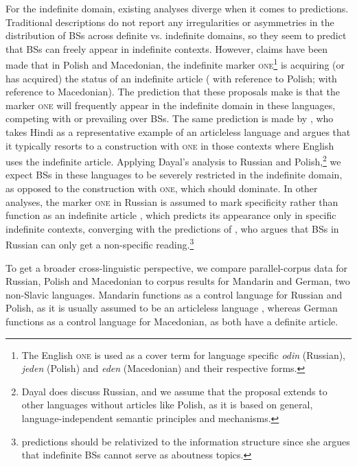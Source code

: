 \documentclass[output=paper,colorlinks,citecolor=brown]{langscibook}
\begin{document}
For the indefinite domain, existing analyses diverge when it comes to predictions. Traditional descriptions do not report any irregularities or asymmetries in the distribution of BSs across definite vs. indefinite domains, so they seem to predict that BSs can freely appear in indefinite contexts. However, claims have been made that in Polish and Macedonian, the indefinite marker \textsc{one}\footnote{The English \textsc{one} is used as a cover term for language specific \textit{odin} (Russian), \textit{jeden} (Polish) and \textit{eden} (Macedonian) and their respective forms.} is acquiring (or has acquired) the status of an indefinite article (\citealt{Hwaszcz.Kedzierska2018, Molinari2022} with reference to Polish; \citealt
{Tomić2006} with reference to Macedonian).
 The prediction that these proposals make is that the marker \textsc{one} will frequently appear in the indefinite domain in these languages, competing with or prevailing over BSs. The same prediction is made by \citet{Dayal2004,Dayal2018}, who 
takes Hindi as a representative example of an articleless language and argues  that it typically resorts to a construction with \textsc{one} in those contexts where English uses the indefinite article. Applying Dayal's analysis to Russian and Polish,\footnote{Dayal does discuss Russian, and we assume that the proposal extends to other languages without articles like Polish, as it is based on general, language-independent semantic principles and mechanisms.} we expect BSs in these languages to be severely restricted in the indefinite domain, as opposed to the construction with \textsc{one}, which should dominate. In other analyses, the marker \textsc{one} in Russian is assumed to mark specificity rather than function as an indefinite article \citep{Ionin2013}, which predicts its appearance only in specific indefinite contexts, converging with the predictions of \citet{Geist2010}, who argues that BSs in Russian can only get a non-specific reading.\footnote{ predictions should be relativized to the information structure since she argues that indefinite BSs cannot serve as aboutness topics.}

To get a broader cross-linguistic perspective, we compare parallel-corpus data for Russian, Polish and Macedonian to corpus results for Mandarin and German, two non-Slavic languages. Mandarin functions as a control language for Russian and Polish, as it is usually assumed to be an articleless language \citep{Li2021}, whereas German functions as a control language for Macedonian, as both have a definite article. 
\end{document}
